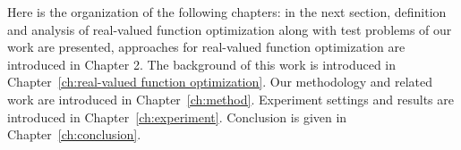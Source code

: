 Here is the organization of the following chapters: in the next section,
definition and analysis of real-valued function optimization along with
test problems of our work are presented, approaches for real-valued
function optimization are introduced in Chapter 2.  The background of
this work is introduced in Chapter~\ref{ch:real-valued function
optimization}. Our methodology and related work are introduced in
Chapter~\ref{ch:method}. Experiment settings and results are introduced
in Chapter~\ref{ch:experiment}.
Conclusion is given in Chapter~\ref{ch:conclusion}. 

